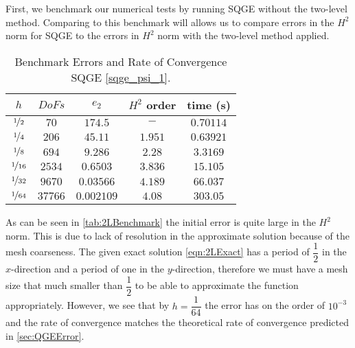 First, we benchmark our numerical tests by running SQGE without the two-level method. Comparing to
this benchmark will allows us to compare errors in the $H^2$ norm for SQGE to the errors in $H^2$
norm with the two-level method applied.
\begin{table}[H]
  \begin{center}
  \begin{tabular}{|c|c|c|c|c|}
    \hline
    $h$ & $DoFs$ & $e_2$ & $H^2$ order & time (s) \\
    \hline
    $\nicefrac{1}{2}$ & $70$ & $174.5$ & $-$ & $0.70114$ \\[0.2em] 
    $\nicefrac{1}{4}$ & $206$ & $45.11$ & $1.951$ & $0.63921$ \\[0.2em] 
    $\nicefrac{1}{8}$ & $694$ & $9.286$ & $2.28$ & $3.3169$ \\[0.2em] 
    $\nicefrac{1}{16}$ & $2534$ & $0.6503$ & $3.836$ & $15.105$ \\[0.2em] 
    $\nicefrac{1}{32}$ & $9670$ &  $0.03566$ & $4.189$ & $66.037$ \\[0.2em] 
    $\nicefrac{1}{64}$ & $37766$ & $0.002109$ & $4.08$ & $303.05$ \\[0.2em]
    \hline
  \end{tabular}
  \caption{Benchmark Errors and Rate of Convergence SQGE \eqref{sqge_psi_1}.}
  \label{tab:2LBenchmark}
  \end{center}
\end{table}
As can be seen in \autoref{tab:2LBenchmark} the initial error is quite large in the $H^2$
norm. This is due to lack of resolution in the approximate solution because of the mesh coarseness.
The given exact solution \eqref{eqn:2LExact} has a period of $\dfrac{1}{2}$ in the $x$-direction and
a period of one in the $y$-direction, therefore we must have a mesh size that much smaller than
$\dfrac{1}{2}$ to be able to approximate the function appropriately. However, we see that by
$h=\dfrac{1}{64}$ the error has on the order of $10^{-3}$ and the rate of convergence matches the
theoretical rate of convergence predicted in \autoref{sec:QGEError}.

